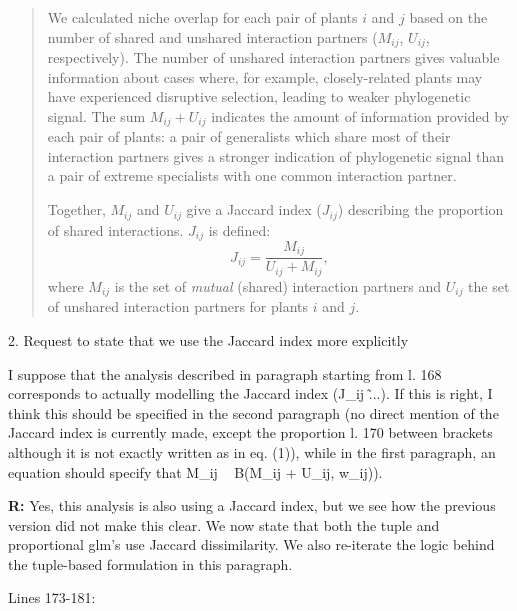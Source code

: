 \documentclass[12pt]{letter}
\newenvironment{refquote}{\bigskip \begin{it}}{\end{it}\smallskip}
\begin{document}
		\begin{quotation}

			We calculated niche overlap for each pair of plants $i$ and $j$ based on the number of shared and unshared interaction partners ($M_{ij}$, $U_{ij}$, respectively). 
			The number of unshared interaction 
			partners gives valuable information about cases where, for example, 
			closely-related plants may have experienced disruptive selection, leading to weaker phylogenetic signal. 
			The sum $M_{ij} + U_{ij}$ indicates the amount of information  provided by each pair of plants: a pair of generalists which share most of their interaction partners gives a stronger indication of phylogenetic signal than a pair of extreme specialists with one common interaction partner.


			Together, $M_{ij}$ and $U_{ij}$ give a Jaccard index ($J_{ij}$) describing 
			the proportion of shared interactions. $J_{ij}$ is defined: 
			\begin{equation}
			J_{ij} = \frac{M_{ij}}{U_{ij}+M_{ij}} ,
			\end{equation}
			where $M_{ij}$ is the set of \emph{mutual} (shared) interaction partners and $U_{ij}$ the set of unshared interaction partners for plants $i$ and $j$.

		\end{quotation} 


	2. Request to state that we use the Jaccard index more explicitly 


		\begin{refquote}
			I suppose that the analysis described in paragraph starting from l. 168 corresponds to actually modelling the Jaccard index (J\_ij \~ ...). If this is right, I think this should be specified in the second paragraph (no direct mention of the Jaccard index is currently made, except the proportion l. 170 between brackets although it is not exactly written as in eq. (1)), while in the first paragraph, an equation should specify that M\_ij ~ B(M\_ij + U\_ij, w\_ij)).
		\end{refquote}


		\textbf{R:} Yes, this analysis is also using a Jaccard index, but we see how the previous version did not make this clear. We now state that both the tuple and proportional glm's use Jaccard dissimilarity. We also re-iterate the logic behind the tuple-based formulation in this paragraph.


			Lines 173-181:
\end{document}

